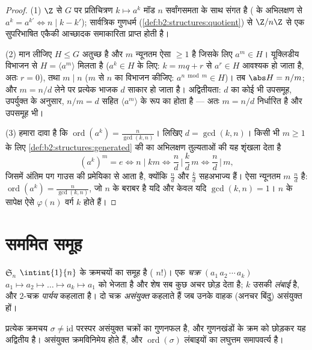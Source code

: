 \begin{proof}
(1) $\Z$ से $G$ पर प्रतिचित्रण $k \mapsto a^k$ मॉड $n$ सर्वांगसमता के साथ संगत है
( के अभिलक्षण से $a^{k} = a^{k'} \iff n \mid k - k'$); सार्वत्रिक गुणधर्म (\cref{def:b2:structures:quotient}) से $\Z/n\Z$ से एक
सुपरिभाषित एकैकी आच्छादक समाकारिता प्राप्त होती है।

(2) मान लीजिए $H \leq G$ अतुच्छ है और $m$ न्यूनतम ऐसा $\geq 1$ है जिसके लिए $a^m \in
H$।
यूक्लिडीय विभाजन से $H = \langle a^m\rangle$ मिलता है ($a^k \in
H$ के लिए: $k = mq + r$ से $a^r \in H$ आवश्यक हो
जाता है, अतः $r = 0$), तथा $m \mid n$ ($m$ से $n$ का विभाजन कीजिए: $a^{n \bmod m} \in H$)। तब
$\abs H = n/m$; और $m = n/d$ लेने पर प्रत्येक भाजक $d$ साकार हो जाता है।
अद्वितीयता:  $d$ का कोई भी उपसमूह, उपर्युक्त के अनुसार, $n/m = d$
सहित $\langle a^m \rangle$ के रूप का होता है --- अतः $m = n/d$ निर्धारित है और उपसमूह भी।

(3) हमारा दावा है कि $\operatorname{ord}(a^k) = \frac{n}{\gcd(k, n)}$। लिखिए $d = \gcd(k, n)$। किसी भी $m \geq 1$ के लिए \cref{def:b2:structures:generated} की 
का अभिलक्षण तुल्यताओं की यह शृंखला देता है
\[
(a^k)^m = e
\iff n \mid km
\iff \frac{n}{d} \,\Big|\, \frac{k}{d}\,m
\iff \frac{n}{d} \,\Big|\, m ,
\]
जिसमें अंतिम पग गाउस की प्रमेयिका से आता है, क्योंकि $\frac nd$ और $\frac kd$
सहअभाज्य हैं। ऐसा न्यूनतम $m$ $\frac nd$ है: $\operatorname{ord}(a^k) = \frac n{\gcd(k,n)}$, जो $n$ के बराबर है यदि और
केवल यदि $\gcd(k, n) = 1$। $n$ के सापेक्ष ऐसे $\varphi(n)$ वर्ग $k$ होते हैं।
\end{proof}

\section{सममित समूह}

\begin{definition}\label{def:b2:structures:sn}
$\mathfrak{S}_n$ $\intint{1}{n}$ के क्रमचयों का समूह है ( $n!$)। एक \emph{चक्र}
$(a_1\,a_2\,\cdots\,a_k)$ $a_1 \mapsto a_2 \mapsto \dots \mapsto a_k \mapsto a_1$ को भेजता है और शेष सब कुछ अचर छोड़ देता है; $k$ उसकी
\emph{लंबाई} है, और $2$-चक्र \emph{पार्यय} कहलाता है। दो
चक्र \emph{असंयुक्त} कहलाते हैं जब उनके वाहक (अनचर बिंदु) असंयुक्त हों।
\end{definition}

\begin{theorem}[चक्र अपघटन]\label{thm:b2:structures:cycles}
प्रत्येक क्रमचय $\sigma \neq \mathrm{id}$ परस्पर असंयुक्त चक्रों का गुणनफल है, और गुणनखंडों
के क्रम को छोड़कर यह अद्वितीय है। असंयुक्त  क्रमविनिमेय होते हैं,
और $\operatorname{ord}(\sigma)$ लंबाइयों का लघुत्तम समापवर्त्य है।
\end{theorem}

